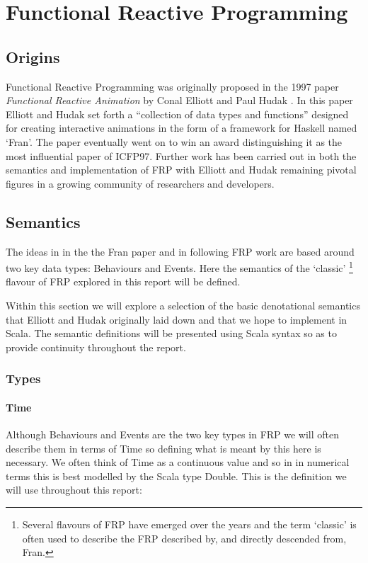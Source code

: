 \chapter{Functional Reactive Programming}
  \section{Origins}
    Functional Reactive Programming was originally proposed in the 1997 paper \emph{Functional
    Reactive Animation} by Conal Elliott and Paul Hudak \cite{Elliott1997}. In this paper Elliott and Hudak
    set forth a ``collection of data types and functions'' designed for creating interactive 
    animations in the form of a framework for Haskell named `Fran'. The paper eventually went on to
    win an award distinguishing it as the most influential paper of ICFP97. 
    Further work has been carried out in both the semantics and implementation of FRP with Elliott and Hudak 
    remaining pivotal figures in a growing community of researchers and developers.
    
  \section{Semantics}
    The ideas in in the the Fran paper and in following FRP work are based around two key data types: 
    Behaviours and Events. Here the semantics of the `classic' \footnote{Several
    flavours of FRP have emerged over the years and the term `classic' is often used to describe
    the FRP described by, and directly descended from, Fran.} flavour of FRP explored in this report will be defined.
    
    Within this section we will explore a selection of the basic denotational semantics that Elliott
    and Hudak originally laid down and that we hope to implement in Scala. The semantic definitions will
    be presented using Scala syntax so as to provide continuity throughout the report.
  
    \subsection{Types}
      \subsubsection{Time}
        Although Behaviours and Events are the two key types in FRP we will often describe them
        in terms of Time so defining what is meant by this here is necessary. We often think of
        Time as a continuous value and so in in numerical terms this is best modelled by the
        Scala type Double. This is the definition we will use throughout this report:

